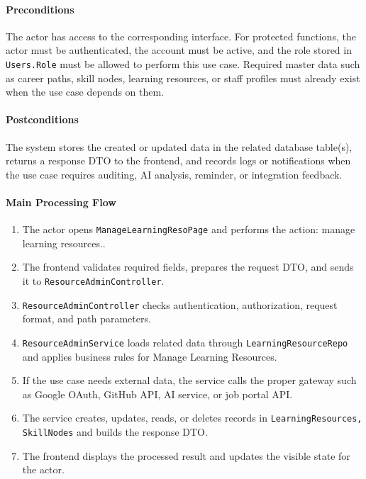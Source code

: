 \paragraph{Preconditions}

The actor has access to the corresponding interface. For protected functions, the actor must be authenticated, the account must be active, and the role stored in \texttt{Users.Role} must be allowed to perform this use case. Required master data such as career paths, skill nodes, learning resources, or staff profiles must already exist when the use case depends on them.

\paragraph{Postconditions}

The system stores the created or updated data in the related database table(s), returns a response DTO to the frontend, and records logs or notifications when the use case requires auditing, AI analysis, reminder, or integration feedback.

\paragraph{Main Processing Flow}

\begin{enumerate}
    \item The actor opens \texttt{ManageLearningResoPage} and performs the action: manage learning resources..
    \item The frontend validates required fields, prepares the request DTO, and sends it to \texttt{ResourceAdminController}.
    \item \texttt{ResourceAdminController} checks authentication, authorization, request format, and path parameters.
    \item \texttt{ResourceAdminService} loads related data through \texttt{LearningResourceRepo} and applies business rules for Manage Learning Resources.
    \item If the use case needs external data, the service calls the proper gateway such as Google OAuth, GitHub API, AI service, or job portal API.
    \item The service creates, updates, reads, or deletes records in \texttt{LearningResources, SkillNodes} and builds the response DTO.
    \item The frontend displays the processed result and updates the visible state for the actor.
\end{enumerate}

